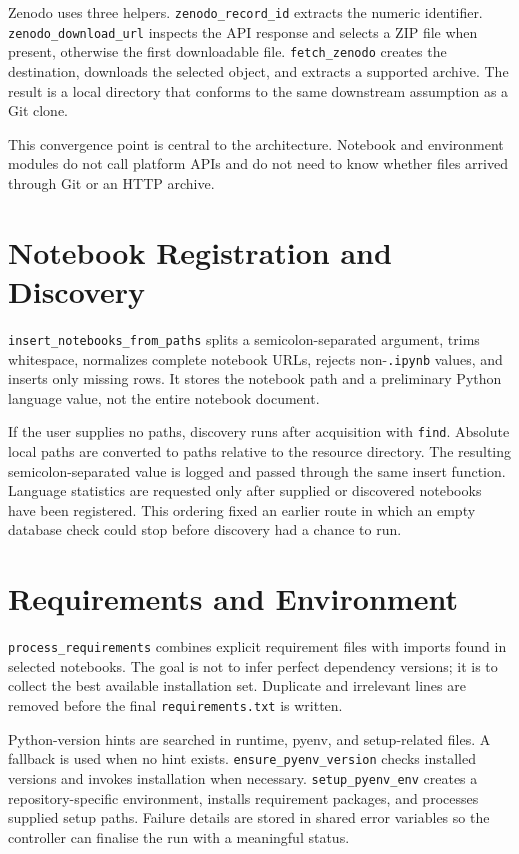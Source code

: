 Zenodo uses three helpers. \texttt{zenodo\_record\_id} extracts the numeric identifier. \texttt{zenodo\_download\_url} inspects the API response and selects a ZIP file when present, otherwise the first downloadable file. \texttt{fetch\_zenodo} creates the destination, downloads the selected object, and extracts a supported archive. The result is a local directory that conforms to the same downstream assumption as a Git clone.

This convergence point is central to the architecture. Notebook and environment modules do not call platform APIs and do not need to know whether files arrived through Git or an HTTP archive.

\section{Notebook Registration and Discovery}

\texttt{insert\_notebooks\_from\_paths} splits a semicolon-separated argument, trims whitespace, normalizes complete notebook URLs, rejects non-\texttt{.ipynb} values, and inserts only missing rows. It stores the notebook path and a preliminary Python language value, not the entire notebook document.

If the user supplies no paths, discovery runs after acquisition with \texttt{find}. Absolute local paths are converted to paths relative to the resource directory. The resulting semicolon-separated value is logged and passed through the same insert function. Language statistics are requested only after supplied or discovered notebooks have been registered. This ordering fixed an earlier route in which an empty database check could stop before discovery had a chance to run.

\section{Requirements and Environment}

\texttt{process\_requirements} combines explicit requirement files with imports found in selected notebooks. The goal is not to infer perfect dependency versions; it is to collect the best available installation set. Duplicate and irrelevant lines are removed before the final \texttt{requirements.txt} is written.

Python-version hints are searched in runtime, pyenv, and setup-related files. A fallback is used when no hint exists. \texttt{ensure\_pyenv\_version} checks installed versions and invokes installation when necessary. \texttt{setup\_pyenv\_env} creates a repository-specific environment, installs requirement packages, and processes supplied setup paths. Failure details are stored in shared error variables so the controller can finalise the run with a meaningful status.

